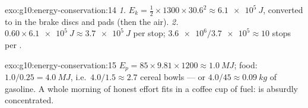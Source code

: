 \begin{solution}{exo:g10:energy-conservation:14}
\emph{1.} $E_k = \tfrac12 \times 1300 \times 30.6^2 \approx
\qty{6.1e5}{J}$, converted to  in the brake discs
and pads (then the air).
\emph{2.} $0.60 \times \qty{6.1e5}{J} \approx \qty{3.7e5}{J}$ per
stop; $\num{3.6e6}/\num{3.7e5} \approx 10$ stops per .
\end{solution}

\begin{solution}{exo:g10:energy-conservation:15}
$E_p = 85 \times 9.81 \times 1200 \approx \qty{1.0}{MJ}$; food:
$1.0/0.25 = \qty{4.0}{MJ}$, i.e.\ $4.0/1.5 \approx 2.7$ cereal
bowls --- or $4.0/45 \approx \qty{0.09}{kg}$ of gasoline. A whole
morning of honest effort fits in a coffee cup of fuel:  is absurdly concentrated.
\end{solution}

